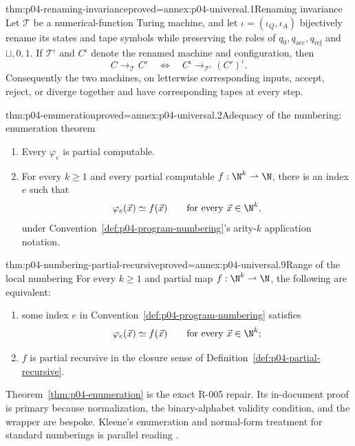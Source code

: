 \begin{hblemma}{thm:p04-renaming-invariance}{proved=annex:p04-universal.1}{Renaming invariance}
Let \(\mathcal T\) be a numerical-function Turing machine, and let
\(\iota=(\iota_Q,\iota_A)\) bijectively rename its states and tape symbols
while preserving the roles of \(q_0,q_{\mathrm{acc}},q_{\mathrm{rej}}\) and
\(\sqcup,0,1\).  If \(\mathcal T^\iota\) and \(C^\iota\) denote the renamed
machine and configuration, then
\[
  C\longrightarrow_{\mathcal T}C'
  \quad\Leftrightarrow\quad
  C^\iota\longrightarrow_{\mathcal T^\iota}(C')^\iota.
\]
Consequently the two machines, on letterwise corresponding inputs, accept,
reject, or diverge together and have corresponding tapes at every step.
\end{hblemma}

\begin{hbtheorem}{thm:p04-enumeration}{proved=annex:p04-universal.2}{Adequacy of the numbering: enumeration theorem}
\begin{enumerate}
  \item[(a)] Every \(\varphi_e\) is partial computable.
  \item[(b)] For every \(k\ge1\) and every partial computable
        \(f:\N^k\rightharpoonup\N\), there is an index \(e\) such that
        \[
          \varphi_e(\vec x)\simeq f(\vec x)
          \qquad\text{for every }\vec x\in\N^k,
        \]
        under Convention~\ref{def:p04-program-numbering}'s arity-\(k\)
        application notation.
\end{enumerate}
\end{hbtheorem}

\begin{hbcorollary}{thm:p04-numbering-partial-recursive}{proved=annex:p04-universal.9}{Range of the local numbering}
For every \(k\geq1\) and partial map \(f:\N^k\rightharpoonup\N\), the
following are equivalent:
\begin{enumerate}
  \item some index \(e\) in Convention~\ref{def:p04-program-numbering}
        satisfies
        \[
          \varphi_e(\vec x)\simeq f(\vec x)
          \qquad\text{for every }\vec x\in\N^k;
        \]
  \item \(f\) is partial recursive in the closure sense of
        Definition~\ref{def:p04-partial-recursive}.
\end{enumerate}
\end{hbcorollary}

Theorem~\ref{thm:p04-enumeration} is the exact R-005 repair.  Its in-document
proof is primary because normalization, the binary-alphabet validity condition,
and the wrapper are bespoke.  Kleene's enumeration and normal-form treatment
for standard numberings is parallel reading \cite{Kleene1952}.

